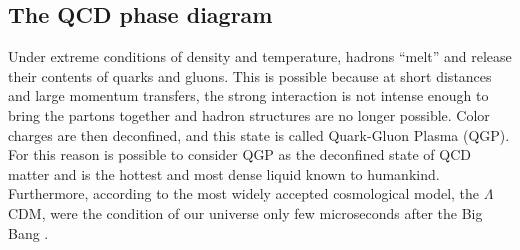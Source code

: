 \documentclass[12pt,a4paper]{book}
\begin{document}
	\subsection{The QCD phase diagram}
	Under extreme conditions of density and temperature, hadrons “melt” and release their contents of quarks and gluons. This is possible because at short distances and large momentum transfers, the strong interaction is not intense enough to bring the partons together and hadron structures are no longer possible. Color charges are then deconfined, and this state is called Quark-Gluon Plasma (QGP). For this reason is possible to consider QGP as the deconfined state of QCD matter and is the hottest and most dense liquid known to humankind. Furthermore, according to the most widely accepted cosmological model, the $\Lambda$CDM, were the condition of our universe only few microseconds after the Big Bang \cite{QCDPhase-Diagram}.
	
\end{document}
